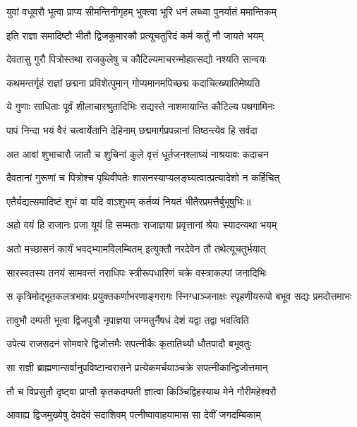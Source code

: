 \twolineshloka
{युवां वधूवरौ भूत्वा प्राप्य सीमन्तिनीगृहम्}
{भुक्त्वा भूरि धनं लब्ध्वा पुनर्यातं ममान्तिकम्} %

\twolineshloka
{इति राज्ञा समादिष्टौ भीतौ द्विजकुमारकौ}
{प्रत्यूचतुरिदं कर्म कर्तुं नौ जायते भयम्} %

\twolineshloka
{देवतासु गुरौ पित्रोस्तथा राजकुलेषु च}
{कौटिल्यमाचरन्मोहात्सद्यो नश्यति सान्वयः} %

\twolineshloka
{कथमन्तर्गृहं राज्ञां छद्मना प्रविशेत्पुमान्}
{गोप्यमानमपिच्छद्म कदाचित्ख्यातिमेष्यति} %

\twolineshloka
{ये गुणाः साधिताः पूर्वं शीलाचारश्रुतादिभिः}
{सद्यस्ते नाशमायान्ति कौटिल्य पथगामिनः} %

\twolineshloka
{पापं निन्दा भयं वैरं चत्वार्येतानि देहिनाम्}
{छद्ममार्गप्रपन्नानां तिष्ठन्त्येव हि सर्वदा} %

\twolineshloka
{अत आवां शुभाचारौ जातौ च शुचिनां कुले}
{वृत्तं धूर्तजनश्लाघ्यं नाश्रयावः कदाचन} %

\twolineshloka
{दैवतानां गुरूणां च पित्रोश्च पृथिवीपतेः}
{शासनस्याप्यलङ्घ्यत्वात्प्रत्यादेशो न कर्हिचित्} %

\twolineshloka
{एतैर्यद्यत्समादिष्टं शुभं वा यदि वाऽशुभम्}
{कर्तव्यं नियतं भीतैरप्रमत्तैर्बुभूषुभिः॥} %

\twolineshloka
{अहो वयं हि राजानः प्रजा यूयं हि सम्मताः}
{राजाज्ञया प्रवृत्तानां श्रेयः स्यादन्यथा भयम्} %

\twolineshloka
{अतो मच्छासनं कार्यं भवद्भ्यामविलम्बितम्}
{इत्युक्तौ नरदेवेन तौ तथेत्यूचतुर्भयात्} %

\twolineshloka
{सारस्वतस्य तनयं सामवन्तं नराधिपः}
{स्त्रीरूपधारिणं चक्रे वस्त्राकल्पां जनादिभिः} %

\fourlineindentedshloka
{स कृत्रिमोद्भूतकलत्रभावः}
{प्रयुक्तकर्णाभरणाङ्गरागः}
{स्निग्धाञ्जनाक्षः स्पृहणीयरूपो}
{बभूव सद्यः प्रमदोत्तमाभः} %

\twolineshloka
{तावुभौ दम्पती भूत्वा द्विजपुत्रौ नृपाज्ञया}
{जग्मतुर्नैषधं देशं यद्वा तद्वा भवत्विति} %

\twolineshloka
{उपेत्य राजसदनं सोमवारे द्विजोत्तमैः}
{सपत्नीकैः कृतातिथ्यौ धौतपादौ बभूवतुः} %

\twolineshloka
{सा राज्ञी ब्राह्मणान्सर्वानुपविष्टान्वरासने}
{प्रत्येकमर्चयाञ्चक्रे सपत्नीकान्द्विजोत्तमान्} %

\twolineshloka
{तौ च विप्रसुतौ दृष्ट्वा प्राप्तौ कृतकदम्पती}
{ज्ञात्वा किञ्चिद्विहस्याथ मेने गौरीमहेश्वरौ} %

\twolineshloka
{आवाह्य द्विजमुख्येषु देवदेवं सदाशिवम्}
{पत्नीष्वावाहयामास सा देवीं जगदम्बिकाम्} %

